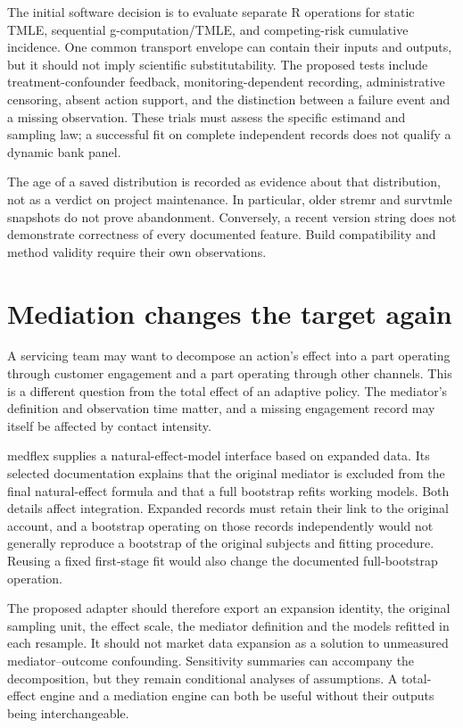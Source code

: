 The initial software decision is to evaluate separate R operations for static
TMLE, sequential g-computation/TMLE, and competing-risk cumulative incidence.
One common transport envelope can contain their inputs and outputs, but it
should not imply scientific substitutability. The proposed tests include
treatment-confounder feedback, monitoring-dependent recording, administrative
censoring, absent action support, and the distinction between a failure event
and a missing observation. These trials must assess the specific estimand and
sampling law; a successful fit on complete independent records does not
qualify a dynamic bank panel.

The age of a saved distribution is recorded as evidence about that distribution,
not as a verdict on project maintenance. In particular, older stremr and
survtmle snapshots do not prove abandonment. Conversely, a recent version
string does not demonstrate correctness of every documented feature. Build
compatibility and method validity require their own observations.

\section{Mediation changes the target again}

A servicing team may want to decompose an action's effect into a part operating
through customer engagement and a part operating through other channels. This
is a different question from the total effect of an adaptive policy. The
mediator's definition and observation time matter, and a missing engagement
record may itself be affected by contact intensity.

medflex supplies a natural-effect-model interface based on expanded data. Its
selected documentation explains that the original mediator is excluded from
the final natural-effect formula and that a full bootstrap refits working
models. Both details affect integration. Expanded records must retain their
link to the original account, and a bootstrap operating on those records
independently would not generally reproduce a bootstrap of the original
subjects and fitting procedure. Reusing a fixed first-stage fit would also
change the documented full-bootstrap operation.\cite{v12_sw_medflex}

The proposed adapter should therefore export an expansion identity, the
original sampling unit, the effect scale, the mediator definition and the
models refitted in each resample. It should not market data expansion as a
solution to unmeasured mediator--outcome confounding. Sensitivity summaries
can accompany the decomposition, but they remain conditional analyses of
assumptions. A total-effect engine and a mediation engine can both be useful
without their outputs being interchangeable.

